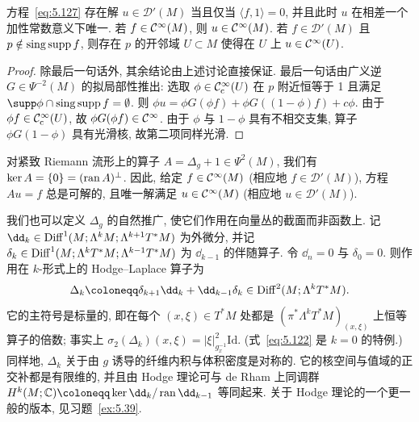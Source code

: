\begin{proposition}\label{prop:5.53}
方程~\eqref{eq:5.127} 存在解 $u \in \mathcal{D}'(M)$ 当且仅当 $\langle f, 1 \rangle = 0$, 并且此时 $u$ 在相差一个加性常数意义下唯一. 若 $f \in \mathcal{C}^\infty(M)$, 则 $u \in \mathcal{C}^\infty(M)$. 若 $f \in \mathcal{D}'(M)$ 且 $p \notin \operatorname{sing\,supp} f$, 则存在 $p$ 的开邻域 $U \subset M$ 使得在 $U$ 上 $u \in \mathcal{C}^\infty(U)$.
\end{proposition}

\begin{proof}
除最后一句话外, 其余结论由上述讨论直接保证. 最后一句话由广义逆 $G \in \Psi^{-2}(M)$ 的拟局部性推出: 选取 $\phi \in \mathcal{C}_{\mathrm{c}}^\infty(U)$ 在 $p$ 附近恒等于 1 且满足 $\supp\phi \cap \singsupp f = \emptyset$. 则 $\phi u = \phi G(\phi f) + \phi G((1-\phi)f) + c\phi$. 由于 $\phi f \in \mathcal{C}_{\mathrm{c}}^\infty(U)$, 故 $\phi G(\phi f) \in \mathcal{C}^\infty$. 由于 $\phi$ 与 $1-\phi$ 具有不相交支集, 算子 $\phi G(1-\phi)$ 具有光滑核, 故第二项同样光滑.
\end{proof}

\begin{example}[平移 Laplace 算子]\label{eg:5.54}
对紧致 Riemann 流形上的算子 $A = \Delta_g + 1 \in \Psi^2(M)$, 我们有 $\ker A = \{0\} = (\operatorname{ran} A)^\perp$. 因此, 给定 $f \in \mathcal{C}^\infty(M)$ (相应地 $f \in \mathcal{D}'(M)$), 方程 $A u = f$ 总是可解的, 且唯一解满足 $u \in \mathcal{C}^\infty(M)$ (相应地 $u \in \mathcal{D}'(M)$).
\end{example}

\begin{example}\label{eg:5.55}
我们也可以定义 $\Delta_g$ 的自然推广, 使它们作用在向量丛的截面而非函数上. 记 $\dd_k \in \Diff^1(M; \Lambda^k M; \Lambda^{k+1} T^* M)$ 为外微分, 并记 $\delta_k \in \operatorname{Diff}^1(M; \Lambda^k T^* M; \Lambda^{k-1} T^* M)$ 为 $\dd_{k-1}$ 的伴随算子. 令 $\dd_n = 0$ 与 $\delta_0 = 0$. 则作用在 $k$-形式上的 Hodge--Laplace 算子为
\begin{equation}\label{eq:5.129}
    \Delta_k \defeq \delta_{k+1} \dd_k + \dd_{k-1} \delta_k \in \Diff^2(M; \Lambda^k T^* M).
\end{equation}
它的主符号是标量的, 即在每个 $(x, \xi) \in T^* M$ 处都是 $(\pi^* \Lambda^k T^* M)_{(x, \xi)}$ 上恒等算子的倍数; 事实上 $\sigma_2(\Delta_k)(x, \xi) = |\xi|^2_{g_x^{-1}} \mathrm{Id}$. (式~\eqref{eq:5.122} 是 $k = 0$ 的特例.) 同样地, $\Delta_k$ 关于由 $g$ 诱导的纤维内积与体积密度是对称的. 它的核空间与值域的正交补都是有限维的, 并且由 Hodge 理论可与 de Rham 上同调群 $H^k(M; \mathbb{C}) \defeq \ker \dd_k / \ran \dd_{k-1}$ 等同起来. 关于 Hodge 理论的一个更一般的版本, 见习题~\ref{ex:5.39}.
\end{example}

